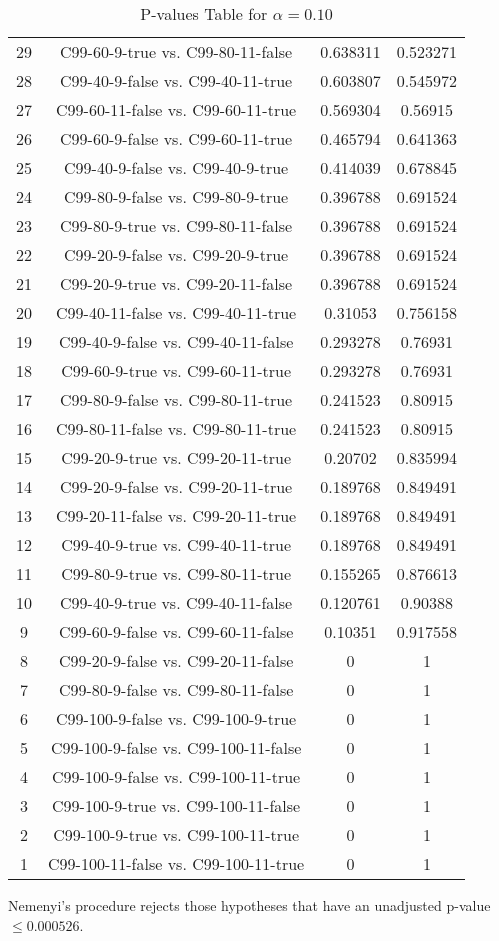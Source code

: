 \documentclass[a4paper,10pt]{article}
\begin{document}
\begin{landscape}
\begin{table}[!htp]
\begin{tabular}{cccc}
29&C99-60-9-true vs. C99-80-11-false&0.638311&0.523271\\
28&C99-40-9-false vs. C99-40-11-true&0.603807&0.545972\\
27&C99-60-11-false vs. C99-60-11-true&0.569304&0.56915\\
26&C99-60-9-false vs. C99-60-11-true&0.465794&0.641363\\
25&C99-40-9-false vs. C99-40-9-true&0.414039&0.678845\\
24&C99-80-9-false vs. C99-80-9-true&0.396788&0.691524\\
23&C99-80-9-true vs. C99-80-11-false&0.396788&0.691524\\
22&C99-20-9-false vs. C99-20-9-true&0.396788&0.691524\\
21&C99-20-9-true vs. C99-20-11-false&0.396788&0.691524\\
20&C99-40-11-false vs. C99-40-11-true&0.31053&0.756158\\
19&C99-40-9-false vs. C99-40-11-false&0.293278&0.76931\\
18&C99-60-9-true vs. C99-60-11-true&0.293278&0.76931\\
17&C99-80-9-false vs. C99-80-11-true&0.241523&0.80915\\
16&C99-80-11-false vs. C99-80-11-true&0.241523&0.80915\\
15&C99-20-9-true vs. C99-20-11-true&0.20702&0.835994\\
14&C99-20-9-false vs. C99-20-11-true&0.189768&0.849491\\
13&C99-20-11-false vs. C99-20-11-true&0.189768&0.849491\\
12&C99-40-9-true vs. C99-40-11-true&0.189768&0.849491\\
11&C99-80-9-true vs. C99-80-11-true&0.155265&0.876613\\
10&C99-40-9-true vs. C99-40-11-false&0.120761&0.90388\\
9&C99-60-9-false vs. C99-60-11-false&0.10351&0.917558\\
8&C99-20-9-false vs. C99-20-11-false&0&1\\
7&C99-80-9-false vs. C99-80-11-false&0&1\\
6&C99-100-9-false vs. C99-100-9-true&0&1\\
5&C99-100-9-false vs. C99-100-11-false&0&1\\
4&C99-100-9-false vs. C99-100-11-true&0&1\\
3&C99-100-9-true vs. C99-100-11-false&0&1\\
2&C99-100-9-true vs. C99-100-11-true&0&1\\
1&C99-100-11-false vs. C99-100-11-true&0&1\\
\hline
\end{tabular}
\caption{P-values Table for $\alpha=0.10$}
\end{table}Nemenyi's procedure rejects those hypotheses that have an unadjusted p-value $\le0.000526$.


\end{landscape}
\end{document}
